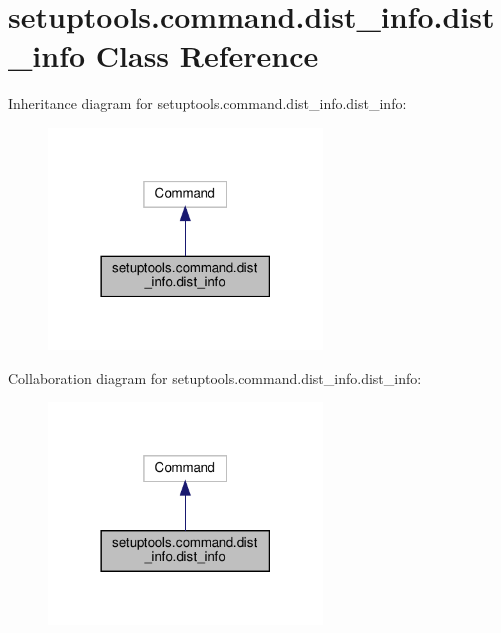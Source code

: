 \hypertarget{classsetuptools_1_1command_1_1dist__info_1_1dist__info}{}\section{setuptools.\+command.\+dist\+\_\+info.\+dist\+\_\+info Class Reference}
\label{classsetuptools_1_1command_1_1dist__info_1_1dist__info}


Inheritance diagram for setuptools.\+command.\+dist\+\_\+info.\+dist\+\_\+info\+:
\nopagebreak
\begin{figure}[H]
\begin{center}
\leavevmode
\includegraphics[width=206pt]{classsetuptools_1_1command_1_1dist__info_1_1dist__info__inherit__graph}
\end{center}
\end{figure}


Collaboration diagram for setuptools.\+command.\+dist\+\_\+info.\+dist\+\_\+info\+:
\nopagebreak
\begin{figure}[H]
\begin{center}
\leavevmode
\includegraphics[width=206pt]{classsetuptools_1_1command_1_1dist__info_1_1dist__info__coll__graph}
\end{center}
\end{figure}
